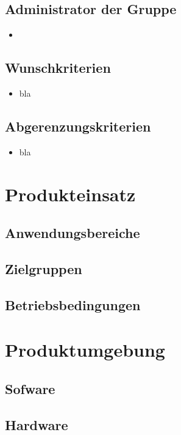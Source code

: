 \documentclass[parskip=full,11pt]{scrartcl}
\begin{document}
\subsection*{Administrator der Gruppe}
\begin{itemize}[itemsep=0pt]
 \item 
\end{itemize}




\subsection{Wunschkriterien}
\begin{itemize}[itemsep=0pt]
\item bla
\end{itemize}
\subsection{Abgerenzungskriterien}
\begin{itemize}[itemsep=0pt]
\item bla
\end{itemize}


\section{Produkteinsatz}

\subsection{Anwendungsbereiche}
\subsection{Zielgruppen}
\subsection{Betriebsbedingungen}


\section{Produktumgebung}
\subsection{Sofware}
\subsection{Hardware}
\end{document}
